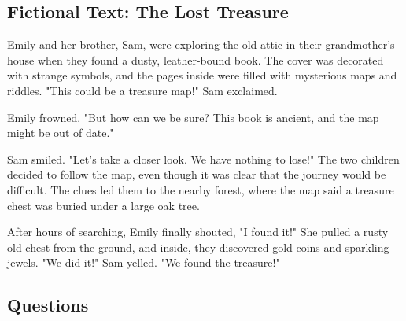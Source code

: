 \documentclass[12pt]{article}
\begin{document}
\onehalfspacing


\subsection*{Fictional Text: The Lost Treasure}

\begin{tcolorbox}[colframe=black!40, colback=gray!5]

\begin{spacing}{1.15}
    Emily and her brother, Sam, were exploring the old attic in their grandmother’s house when they found a dusty, leather-bound book. The cover was decorated with strange symbols, and the pages inside were filled with mysterious maps and riddles. "This could be a treasure map!" Sam exclaimed. 

    Emily frowned. "But how can we be sure? This book is ancient, and the map might be out of date." 

    Sam smiled. "Let’s take a closer look. We have nothing to lose!" The two children decided to follow the map, even though it was clear that the journey would be difficult. The clues led them to the nearby forest, where the map said a treasure chest was buried under a large oak tree.

    After hours of searching, Emily finally shouted, "I found it!" She pulled a rusty old chest from the ground, and inside, they discovered gold coins and sparkling jewels. "We did it!" Sam yelled. "We found the treasure!"

\end{spacing}

\end{tcolorbox}

\vspace{4.5cm}


\subsection*{Questions}
\end{document}
